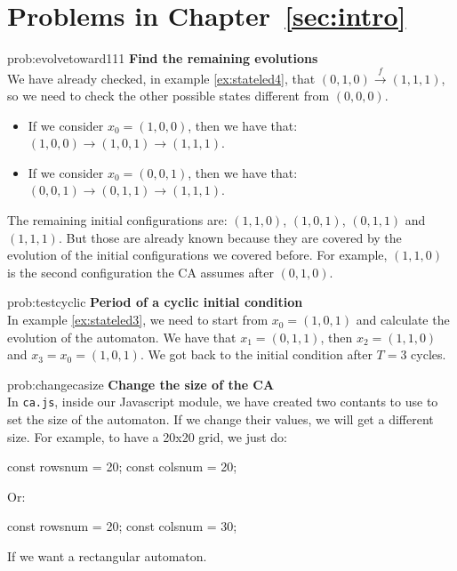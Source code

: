 %


\section*{Problems in Chapter~\ref{sec:intro}}

\begin{sol}{prob:evolvetoward111}
\textbf{Find the remaining evolutions}\\
We have already checked, in example \ref{ex:stateled4}, that
$(0,1,0) \overset{f}{\rightarrow} (1,1,1)$, so we need to check the other possible
states different from $(0,0,0)$.
\begin{itemize}
\item If we consider $x_0 = (1,0,0)$, then we have that: $(1,0,0) \rightarrow (1,0,1) \rightarrow (1,1,1)$.
\item If we consider $x_0 = (0,0,1)$, then we have that: $(0,0,1) \rightarrow (0,1,1) \rightarrow (1,1,1)$.
\end{itemize}
The remaining initial configurations are: $(1,1,0)$, $(1,0,1)$, $(0,1,1)$ and $(1,1,1)$. But those are already
known because they are covered by the evolution of the initial configurations we covered before. For example,
$(1,1,0)$ is the second configuration the CA assumes after $(0,1,0)$.
\end{sol}


\begin{sol}{prob:testcyclic}
\textbf{Period of a cyclic initial condition}\\
In example \ref{ex:stateled3}, we need to start from $x_0 = (1,0,1)$ and calculate the evolution of the automaton.
We have that $x_1 = (0,1,1)$, then $x_2 = (1,1,0)$ and $x_3 = x_ 0 = (1,0,1)$. We got back to the initial
condition after $T=3$ cycles.
\end{sol}

\begin{sol}{prob:changecasize}
\textbf{Change the size of the CA}\\
In \texttt{ca.js}, inside our Javascript module, we have created two contants to use to set the size of the
automaton. If we change their values, we will get a different size. For example, to have a 20x20 grid,
we just do:
\begin{code}
const rowsnum = 20;
const colsnum = 20;
\end{code}
Or:
\begin{code}
const rowsnum = 20;
const colsnum = 30;
\end{code}
If we want a rectangular automaton.
\end{sol}

